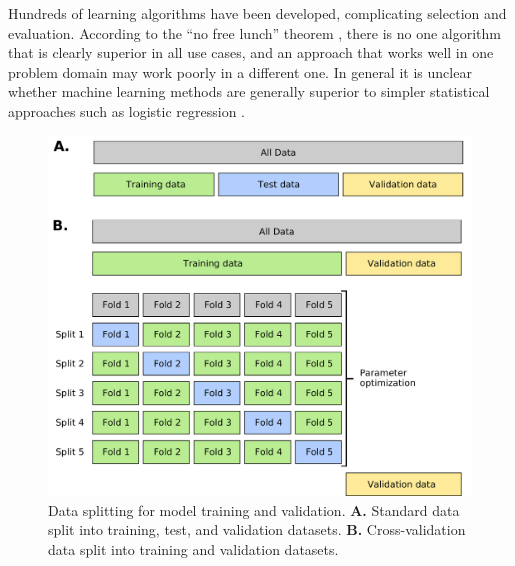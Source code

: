 \documentclass[11pt]{book}
\begin{document}
Hundreds of learning algorithms have been developed, complicating selection and evaluation. According to the ``no free lunch'' theorem \cite{Wolpert:1996}, there is no one algorithm that is clearly superior in all use cases, and an approach that works well in one problem domain may work poorly in a different one. In general it is unclear whether machine learning methods are generally superior to simpler statistical approaches such as logistic regression \cite{Lynam:2020}.

\begin{figure}[t]
\centering
\includegraphics[width=\textwidth]{img/data_splitting.pdf}
\caption[Data Splitting for Model Training and Validation]{Data splitting for model training and validation. \textbf{A.} Standard data split into training, test, and validation datasets. \textbf{B.} Cross-validation data split into training and validation datasets.}
\label{fig:model-training}
\end{figure}
\end{document}
